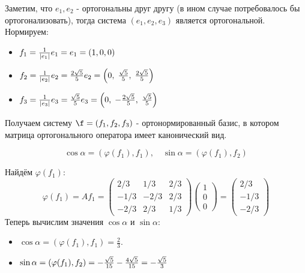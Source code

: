 Заметим, что $e_1, e_2$ - ортогональны друг другу (в ином случае потребовалось бы ортогонализовать), тогда система $(e_1, e_2, e_3)$ является ортогональной. Нормируем:
\begin{itemize}
    \item $f_1 = \frac{1}{|e_1|} e_1 = e_1 = (1, 0, 0)$

    \item $f_2 = \frac{1}{|e_2|} e_2 = \frac{2\sqrt{5}}{5} e_2 =
              \left(0,\; \frac{\sqrt{5}}{5},\; \frac{2 \sqrt{5}}{5}\right)$

    \item $f_3 = \frac{1}{|e_3|} e_3 =\frac{\sqrt{5}}{5} e_3 =
              \left(0,\; -\frac{2 \sqrt{5}}{5},\; \frac{\sqrt{5}}{5}\right)$
\end{itemize}

Получаем систему $\f = (f_1, f_2, f_3)$ - ортонормированный базис, в котором матрица ортогонального оператора имеет канонический вид.

\begin{theorem}
    \[
        \cos{\alpha} = (\varphi(f_1), f_1),
        \quad
        \sin{\alpha} = (\varphi(f_1), f_2)
    \]
\end{theorem}

Найдём $\varphi(f_1)$:
\[
    \varphi(f_1) = A f_1 =
    \begin{pmatrix}
        2/3  & 1/3  & 2/3 \\
        -1/3 & -2/3 & 2/3 \\
        -2/3 & 2/3  & 1/3
    \end{pmatrix}
    \begin{pmatrix}
        1 \\
        0 \\
        0
    \end{pmatrix}
    =
    \begin{pmatrix}
        2/3  \\
        -1/3 \\
        -2/3
    \end{pmatrix}
\]
Теперь вычислим значения $\cos{\alpha}$ и $\sin{\alpha}$:
\begin{itemize}
    \item $\cos{\alpha} = (\varphi(f_1), f_1) = \frac{2}{3}$.

    \item $\sin{\alpha} = (\varphi(f_1), f_2) = -\frac{\sqrt{5}}{15} - \frac{4 \sqrt{5}}{15} = -\frac{\sqrt{5}}{3}$
\end{itemize}

\newpage

